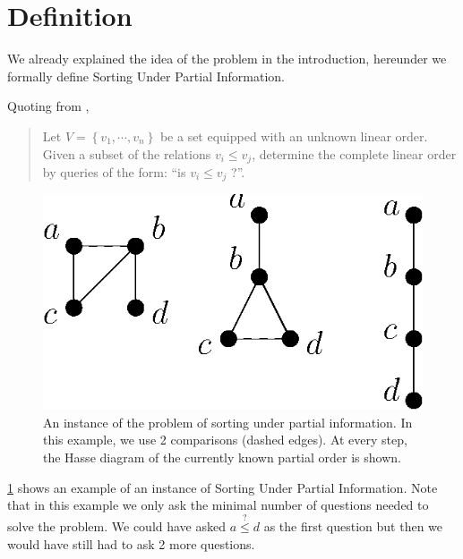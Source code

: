 
\section{Definition}

We already explained the idea of the problem in the introduction, hereunder we formally define Sorting Under Partial Information.

Quoting from \cite{cardinal2013sorting},

\begin{quotation}
	Let $V = \left\{{v_1 , \cdots , v_n }\right\}$ be a set equipped with an unknown linear order. Given a subset of the relations $v_i \leq v_j$, determine the complete linear order by queries of the form: ``is $v_i \leq v_j$ ?''.
\end{quotation}


\begin{figure}
	\centering
	\includegraphics[height=0.2\textheight]{fig/supi/ex2}
	\caption{An instance of the problem of sorting under partial information. In this example, we use 2 comparisons (dashed edges). At every step, the Hasse diagram of the currently known partial order is shown.}
	\label{fig:supi:def:ex2}
\end{figure}


\ref{fig:supi:def:ex2} shows an example of an instance of Sorting Under Partial Information. Note that in this example we only ask the minimal number of questions needed to solve the problem. We could have asked $a \stackrel{?}{\le} d$ as the first question but then we would have still had to ask 2 more questions.